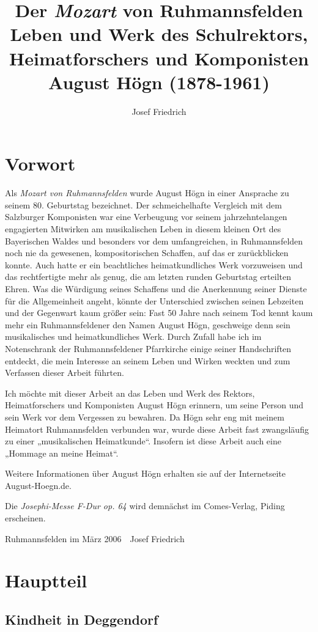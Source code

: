 \documentclass{book}
\title{%
  Der \textit{Mozart} von Ruhmannsfelden\newline
  \large 
  Leben und Werk des Schulrektors, Heimatforschers\newline
  und Komponisten August Högn (1878-1961)
}
\author{Josef Friedrich}
\begin{document}
\chapter{Vorwort}

Als \textit{Mozart von Ruhmannsfelden} wurde August Högn in einer
Ansprache zu seinem 80. Geburtstag bezeichnet. Der schmeichelhafte
Vergleich mit dem Salzburger Komponisten war eine Verbeugung vor seinem
jahrzehntelangen engagierten Mitwirken am musikalischen Leben in diesem
kleinen Ort des Bayerischen Waldes und besonders vor dem umfangreichen,
in Ruhmannsfelden noch nie da gewesenen, kompositorischen Schaffen, auf
das er zurückblicken konnte. Auch hatte er ein beachtliches
heimatkundliches Werk vorzuweisen und das rechtfertigte mehr als genug,
die am letzten runden Geburtstag erteilten Ehren. Was die Würdigung
seines Schaffens und die Anerkennung seiner Dienste für die
Allgemeinheit angeht, könnte der Unterschied zwischen seinen Lebzeiten
und der Gegenwart  kaum größer sein: Fast 50 Jahre nach seinem Tod
kennt kaum mehr ein Ruhmannsfeldener den Namen August Högn, geschweige
denn sein musikalisches und heimatkundliches Werk. Durch Zufall habe
ich im Notenschrank der Ruhmannsfeldener Pfarrkirche einige seiner
Handschriften entdeckt, die mein Interesse an seinem Leben und Wirken
weckten und zum Verfassen dieser Arbeit führten.

Ich möchte mit dieser Arbeit an das Leben und Werk des Rektors,
Hei\-matforschers und Komponisten August Högn erinnern, um seine Person
und sein Werk vor dem Vergessen zu bewahren. Da Högn sehr eng mit
meinem Heimatort Ruhmannsfelden verbunden war, wurde diese Arbeit fast
zwangs\-läufig zu einer „musikalischen Heimatkunde“. Insofern ist diese
Arbeit auch eine „Hommage an meine Heimat“.

Weitere Informationen über August Högn erhalten sie auf der
Internetseite August-Hoegn.de.

Die \textit{Josephi-Messe F-Dur op. 64} wird demnächst im Comes-Verlag,
Piding erscheinen. 

Ruhmannsfelden im März 2006\ \ Josef Friedrich

\chapter{Hauptteil}

\section{Kindheit in Deggendorf}
\end{document}
